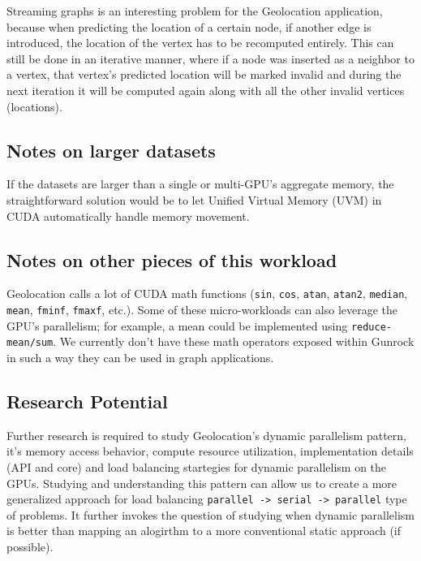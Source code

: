 \documentclass[10pt,oneside]{memoir}
\begin{document}
Streaming graphs is an interesting problem for the Geolocation
application, because when predicting the location of a certain node, if
another edge is introduced, the location of the vertex has to be
recomputed entirely. This can still be done in an iterative manner,
where if a node was inserted as a neighbor to a vertex, that vertex's
predicted location will be marked invalid and during the next iteration
it will be computed again along with all the other invalid vertices
(locations).

\hypertarget{notes-on-larger-datasets-1}{%
\subsection{Notes on larger datasets}\label{notes-on-larger-datasets-1}}

If the datasets are larger than a single or multi-GPU's aggregate
memory, the straightforward solution would be to let Unified Virtual
Memory (UVM) in CUDA automatically handle memory movement.

\hypertarget{notes-on-other-pieces-of-this-workload-1}{%
\subsection{Notes on other pieces of this
workload}\label{notes-on-other-pieces-of-this-workload-1}}

Geolocation calls a lot of CUDA math functions (\texttt{sin},
\texttt{cos}, \texttt{atan}, \texttt{atan2}, \texttt{median},
\texttt{mean}, \texttt{fminf}, \texttt{fmaxf}, etc.). Some of these
micro-workloads can also leverage the GPU's parallelism; for example, a
mean could be implemented using \texttt{reduce-mean/sum}. We currently
don't have these math operators exposed within Gunrock in such a way
they can be used in graph applications.

\hypertarget{research-potential}{%
\subsection{Research Potential}\label{research-potential}}

Further research is required to study Geolocation's dynamic parallelism
pattern, it's memory access behavior, compute resource utilization,
implementation details (API and core) and load balancing startegies for
dynamic parallelism on the GPUs. Studying and understanding this pattern
can allow us to create a more generalized approach for load balancing
\texttt{parallel\ -\textgreater{}\ serial\ -\textgreater{}\ parallel}
type of problems. It further invokes the question of studying when
dynamic parallelism is better than mapping an alogirthm to a more
conventional static approach (if possible).
\end{document}
